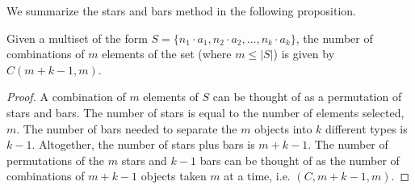 \documentclass[handout]{ximera}
\begin{document}
We summarize the stars and bars method in the following proposition.

\begin{proposition}
Given a multiset of the form $S = \{n_1 \cdot a_1, n_2 \cdot a_2, \ldots, n_k \cdot a_k\}$, 
the number of combinations of $m$ elements of the set (where $m \leq |S|$) is given by
$C(m+k-1, m)$.
\end{proposition}
\begin{proof}
A combination of $m$ elements of $S$ can be thought of as a permutation of stars and bars. 
The number of stars is equal to the number of elements selected, $m$. 
The number of bars needed to separate the $m$ objects into $k$ different types is $k-1$. 
Altogether, the number of stars plus bars is $m + k-1$. 
The number of permutations of the $m$ stars and $k-1$ bars can be thought of as 
the number of combinations of $m+k-1$ objects taken $m$ at a time, i.e. $(C, m+k-1,m)$. 
\end{proof}
\end{document}
